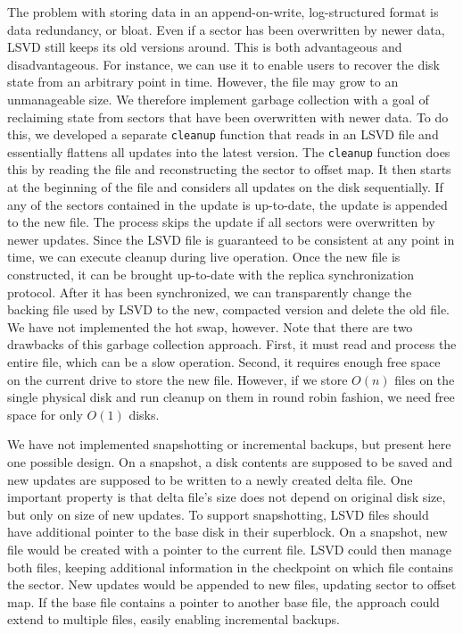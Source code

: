 The problem with storing data in an append-on-write, log-structured format is data redundancy, or bloat. Even if a sector has been overwritten by newer data, LSVD still keeps its old versions around. This is both advantageous and disadvantageous. For instance, we can use it to enable users to recover the disk state from an arbitrary point in time. However, the file may grow to an unmanageable size. We therefore implement garbage collection with a goal of reclaiming state from sectors that have been overwritten with newer data. To do this, we developed a separate \texttt{cleanup} function that reads in an LSVD file and essentially flattens all updates into the latest version. The \texttt{cleanup} function does this by reading the file and reconstructing the sector to offset map. It then starts at the beginning of the file and considers all updates on the disk sequentially. If any of the sectors contained in the update is up-to-date, the update is appended to the new file. The process skips the update if all sectors were overwritten by newer updates. Since the LSVD file is guaranteed to be consistent at any point in time, we can execute cleanup during live operation. Once the new file is constructed, it can be brought up-to-date with the replica synchronization protocol. After it has been synchronized, we can transparently change the backing file used by LSVD to the new, compacted version and delete the old file. We have not implemented the hot swap, however. Note that there are two drawbacks of this garbage collection approach. First, it must read and process the entire file, which can be a slow operation. Second, it requires enough free space on the current drive to store the new file. However, if we store $O(n)$ files on the single physical disk and run cleanup on them in round robin fashion, we need free space for only $O(1)$ disks.

We have not implemented snapshotting or incremental backups, but present here one possible design. On a snapshot, a disk contents are supposed to be saved and new updates are supposed to be written to a newly created delta file. One important property is that delta file's size does not depend on original disk size, but only on size of new updates. To support snapshotting, LSVD files should have additional pointer to the base disk in their superblock. On a snapshot, new file would be created with a pointer to the current file. LSVD could then manage both files, keeping additional information in the checkpoint on which file contains the sector. New updates would be appended to new files, updating sector to offset map. If the base file contains a pointer to another base file, the approach could extend to multiple files, easily enabling incremental backups.

